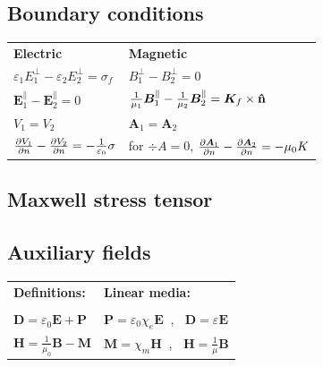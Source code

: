 \documentclass[letterpaper,landscape,10pt]{article}
\begin{document}
{\begin{multicols}{4}
	\subsection*{Boundary conditions}
    	\begin{tabular}{l l}
			\textbf{Electric} & \textbf{Magnetic} \\
			$\varepsilon_1E_1^\perp-\varepsilon_2E_2^\perp=\sigma_{f}$ & $B_1^\perp-B_2^\perp=0$ \\
			$\bm{E}_1^\parallel-\bm{E}_2^\parallel=0$ & $\frac{1}{\mu_1}\bm{B}_1^\parallel-\frac{1}{\mu_2}\bm{B}_2^\parallel=\bm{K}_f\times\mathbf{\hat{n}}$ \\
			$V_{\textrm{1}} = V_{\textrm{2}}$ & $\bm{A}_{\textrm{1}} = \bm{A}_{\textrm{2}}$ \\
				$\frac{\partial V_{\textrm{1}}}{\partial n} - \frac{\partial V_{\textrm{2}}}{\partial n} = -\frac{1}{\varepsilon_0}\sigma$ &
				for $\div{A}=0$, $\frac{\partial \bm{A}_{\textrm{1}}}{\partial n} - \frac{\partial \bm{A}_{\textrm{2}}}{\partial n} = -\mu_0 K$ \\
    	\end{tabular}
	\subsection*{Maxwell stress tensor}

	\subsection*{Auxiliary fields}
    	\begin{tabular}{l l}
    		\textbf{Definitions:} & \textbf{Linear media:} \\[3pt]
    		\\[3pt]
			$\bm{D}=\varepsilon_0\bm{E}+\bm{P}$ &
			$\bm{P}=\varepsilon_0\chi_e\bm{E}\;\;$, $\;\;\bm{D}=\varepsilon\bm{E}$ \\
			$\bm{H}=\frac{1}{\mu_0}\bm{B}-\bm{M}$ &
			$\bm{M}=\chi_m\bm{H}\;\;$, $\;\;\bm{H}=\frac{1}{\mu}\bm{B}$
 		\end{tabular}
	

\end{multicols}}
\end{document}
